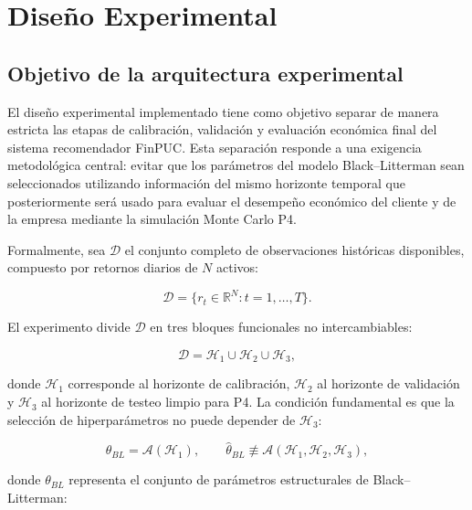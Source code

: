 \documentclass[11pt]{article}
\begin{document}
\section{Dise\~no Experimental}

\subsection{Objetivo de la arquitectura experimental}

El dise\~no experimental implementado tiene como objetivo separar de manera estricta las etapas de calibraci\'on, validaci\'on y evaluaci\'on econ\'omica final del sistema recomendador FinPUC. Esta separaci\'on responde a una exigencia metodol\'ogica central: evitar que los par\'ametros del modelo Black--Litterman sean seleccionados utilizando informaci\'on del mismo horizonte temporal que posteriormente ser\'a usado para evaluar el desempe\~no econ\'omico del cliente y de la empresa mediante la simulaci\'on Monte Carlo P4.

Formalmente, sea $\mathcal{D}$ el conjunto completo de observaciones hist\'oricas disponibles, compuesto por retornos diarios de $N$ activos:

\begin{equation}
    \mathcal{D} = \{r_t \in \mathbb{R}^{N} : t = 1,\dots,T\}.
\end{equation}

El experimento divide $\mathcal{D}$ en tres bloques funcionales no intercambiables:

\begin{equation}
    \mathcal{D}
    =
    \mathcal{H}_1
    \cup
    \mathcal{H}_2
    \cup
    \mathcal{H}_3,
\end{equation}

donde $\mathcal{H}_1$ corresponde al horizonte de calibraci\'on, $\mathcal{H}_2$ al horizonte de validaci\'on y $\mathcal{H}_3$ al horizonte de testeo limpio para P4. La condici\'on fundamental es que la selecci\'on de hiperpar\'ametros no puede depender de $\mathcal{H}_3$:

\begin{equation}
    \widehat{\theta}_{BL}
    =
    \mathcal{A}(\mathcal{H}_1),
    \qquad
    \widehat{\theta}_{BL}
    \not\equiv
    \mathcal{A}(\mathcal{H}_1,\mathcal{H}_2,\mathcal{H}_3),
\end{equation}

donde $\theta_{BL}$ representa el conjunto de par\'ametros estructurales de Black--Litterman:
\end{document}
